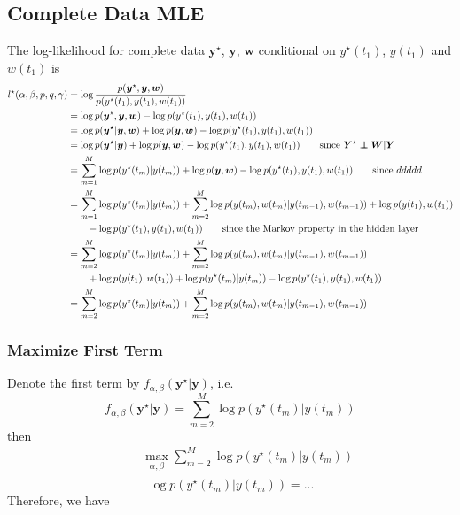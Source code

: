 \documentclass[10pt,letterpaper]{article}
\numberwithin{table}{section}
\numberwithin{figure}{section}
\numberwithin{equation}{section}
\newcommand\independent{\protect\mathpalette{\protect\independenT}{\perp}}
\def\independenT#1#2{\mathrel{\rlap{$#1#2$}\mkern2mu{#1#2}}}
\begin{document}
\subsection{Complete Data MLE}
The log-likelihood for complete data $\bm y^\star$, $\bm y$, $\bm w$ conditional on $y^\star(t_1)$, $y(t_1)$ and $w(t_1)$ is 
\begin{equation}
\begin{split}
l^\star(\alpha,\beta,p,q,\gamma) 
&=\log 
\frac{p(\bm y^\star, \bm y, \bm w )}
{p(y^\star(t_1), y(t_1),w(t_1) )} \\
& = \log p(\bm y^\star, \bm y, \bm w ) - \log p(y^\star(t_1), y(t_1), w(t_1) ) \\
& = \log p(\bm {y^\star}|\bm{y},\bm {w}) 
+ \log p(\bm y, \bm w) -   \log p(y^\star(t_1), y(t_1), w(t_1) )\\
& = \log p(\bm {y^\star}|\bm{y}) 
+ \log p(\bm y, \bm w) -   \log p(y^\star(t_1), y(t_1), w(t_1) ) 
\qquad \text{since } \bm Y^\star \independent \bm W| \bm Y
\\
& = \sum_{m=1}^M \log p(y^\star(t_m)|y(t_m))
+ \log p(\bm y, \bm w) -   \log p(y^\star(t_1), y(t_1), w(t_1) ) 
\qquad \text{since } ddddd \\
&=  \sum_{m=1}^M \log p(y^\star(t_m)|y(t_m))
+ \sum_{m=2}^M\log p(y(t_m), w(t_m)|y(t_{m-1}), w(t_{m-1})) + \log p(y(t_1), w(t_1)) \\
& \qquad - \log p(y^\star(t_1), y(t_1), w(t_1) ) 
\qquad \text{since the Markov property in the hidden layer} \\
&=  \sum_{m=2}^M \log p(y^\star(t_m)|y(t_m))
+ \sum_{m=2}^M\log p(y(t_m), w(t_m)|y(t_{m-1}), w(t_{m-1}))  \\
& \qquad + \log p(y(t_1), w(t_1))+\log p(y^\star(t_m)|y(t_m)) - \log p(y^\star(t_1), y(t_1), w(t_1) ) \\
& =  \sum_{m=2}^M \log p(y^\star(t_m)|y(t_m))
+ \sum_{m=2}^M\log p(y(t_m), w(t_m)|y(t_{m-1}), w(t_{m-1})) 
\end{split}
\end{equation}

\subsubsection{Maximize First Term}
Denote the first term by $f_{\alpha,\beta}(\bm y^\star|\bm y)$, i.e.
\begin{equation}
f_{\alpha,\beta}(\bm y^\star|\bm y) =  \sum_{m=2}^M \log p(y^\star(t_m)|y(t_m)) 
\end{equation}
then 
\begin{equation}
\begin{split}
& \qquad \max_{\alpha,
\beta} \sum_{m=2}^M \log p(y^\star(t_m)|y(t_m)) \\
\end{split}
\end{equation}
\begin{equation}
\log p(y^\star(t_m)|y(t_m)) = ...
\end{equation}
Therefore, we have
 
\end{document}
